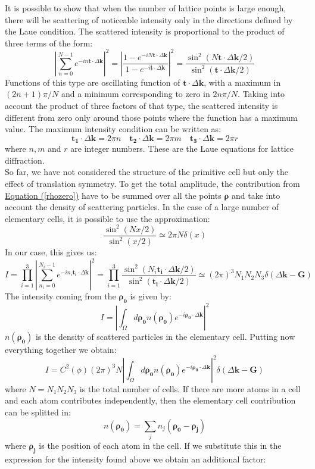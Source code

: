 \documentclass[10.75pt,a4paper,openright,bottom=2cm]{article}
\renewcommand{\Vec}[1]{\boldsymbol{#1}}
\begin{document}
It is possible to show that when the number of lattice points is large enough, there will be scattering of noticeable intensity only in the directions defined by the Laue condition. The scattered intensity is proportional to the product of three terms of the form:
\[
\left|\sum_{n=0}^{N-1}e^{-in\Vec{t}\cdot\Delta\Vec{k}}\right|^2=\left|\frac{1-e^{-iN\Vec{t}\cdot\Delta\Vec{k}}}{1-e^{-i\Vec{t}\cdot\Delta\Vec{k}}}\right|^2=\frac{\sin^2(N\Vec{t}\cdot\Delta\Vec{k}/2)}{\sin^2(\Vec{t}\cdot\Delta\Vec{k}/2)}
\]
Functions of this type are oscillating function of $\Vec{t}\cdot\Delta\Vec{k}$, with a maximum in $(2n+1)\pi/N$ and a minimum corresponding to zero in $2n\pi/N$. Taking into account the product of three factors of that type, the scattered intensity is different from zero only around those points where the function has a maximum value. The maximum intensity condition can be written as:
\[
\Vec{t_1}\cdot\Delta\Vec{k}=2\pi n \quad \Vec{t_2}\cdot\Delta\Vec{k}=2\pi m \quad \Vec{t_3}\cdot\Delta\Vec{k}=2\pi r
\]
where $n,m$ and $r$ are integer numbers. These are the Laue equations for lattice diffraction.\\
So far, we have not considered the structure of the primitive cell but only the effect of translation symmetry. To get the total amplitude, the contribution from \hyperref[rhozero]{Equation (\ref{rhozero})} have to be summed over all the points $\Vec{\rho}$ and take into account the density of scattering particles. In the case of a large number of elementary cells, it is possible to use the approximation:
\[
\frac{\sin^2(Nx/2)}{\sin^2(x/2)}\simeq2\pi N\delta(x)
\]
In our case, this gives us:
\[
I=\prod_{i=1}^3\left|\sum_{n_i=0}^{N_i-1}e^{-in_i\Vec{t_i}\cdot\Delta\Vec{k}}\right|^2=\prod_{i=1}^3\frac{\sin^2(N_i\Vec{t_i}\cdot\Delta\Vec{k}/2)}{\sin^2(\Vec{t_i}\cdot\Delta\Vec{k}/2)}\simeq(2\pi)^3N_1N_2N_3\delta(\Delta\Vec{k}-\Vec{G})
\]
The intensity coming from the $\Vec{\rho_0}$ is given by:
\[
I=\left|\int_\Omega d\Vec{\rho_0}n(\Vec{\rho_0})e^{-i\Vec{\rho_0}\cdot\Delta\Vec{k}}\right|^2
\]
$n(\Vec{\rho_0})$ is the density of scattered particles in the elementary cell. Putting now everything together we obtain:
\[
I=C^2(\phi)(2\pi)^3N\left|\int_\Omega d\Vec{\rho_0}n(\Vec{\rho_0})e^{-i\Vec{\rho_0}\cdot\Delta\Vec{k}}\right|^2\delta(\Delta\Vec{k}-\Vec{G})
\]
where $N=N_1N_2N_3$ is the total number of cells. If there are more atoms in a cell and each atom contributes independently, then the elementary cell contribution can be splitted in:
\[
n(\Vec{\rho_0})=\sum_jn_j(\Vec{\rho_0}-\Vec{\rho_j})
\]
where $\Vec{\rho_j}$ is the position of each atom in the cell. If we substitute this in the expression for the intensity found above we obtain an additional factor:
\end{document}
